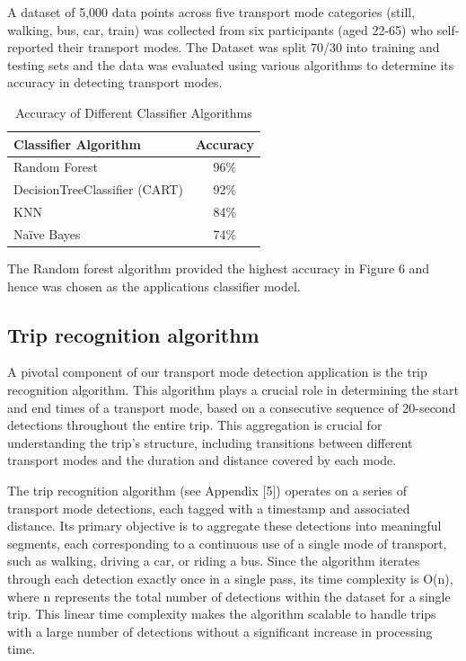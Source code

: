 \documentclass{l4proj}
\begin{document}
A dataset of 5,000 data points across five transport mode categories (still, walking, bus, car, train) was collected from six participants (aged 22-65) who self-reported their transport modes. The Dataset was split 70/30 into training and testing sets and the data was evaluated using various algorithms to determine its accuracy in detecting transport modes.

\begin{table}[ht]
\centering
\begin{tabular}{|l|c|}
\hline
Classifier Algorithm             & Accuracy \\ \hline
Random Forest                    & 96\%     \\
DecisionTreeClassifier (CART)    & 92\%     \\
KNN                              & 84\%     \\
Naïve Bayes                      & 74\%     \\ \hline
\end{tabular}
\caption{Accuracy of Different Classifier Algorithms}
\label{tab:classifier_accuracy}
\end{table}

The Random forest algorithm provided the highest accuracy in Figure 6 and hence was chosen as the applications classifier model.

\subsection{Trip recognition algorithm}

A pivotal component of our transport mode detection application is the trip recognition algorithm. This algorithm plays a crucial role in determining the start and end times of a transport mode, based on a consecutive sequence of 20-second detections throughout the entire trip. This aggregation is crucial for understanding the trip's structure, including transitions between different transport modes and the duration and distance covered by each mode.

The trip recognition algorithm (see Appendix [5]) operates on a series of transport mode detections, each tagged with a timestamp and associated distance. Its primary objective is to aggregate these detections into meaningful segments, each corresponding to a continuous use of a single mode of transport, such as walking, driving a car, or riding a bus. Since the algorithm iterates through each detection exactly once in a single pass, its time complexity is O(n), where n represents the total number of detections within the dataset for a single trip. This linear time complexity makes the algorithm scalable to handle trips with a large number of detections without a significant increase in processing time.
\end{document}
